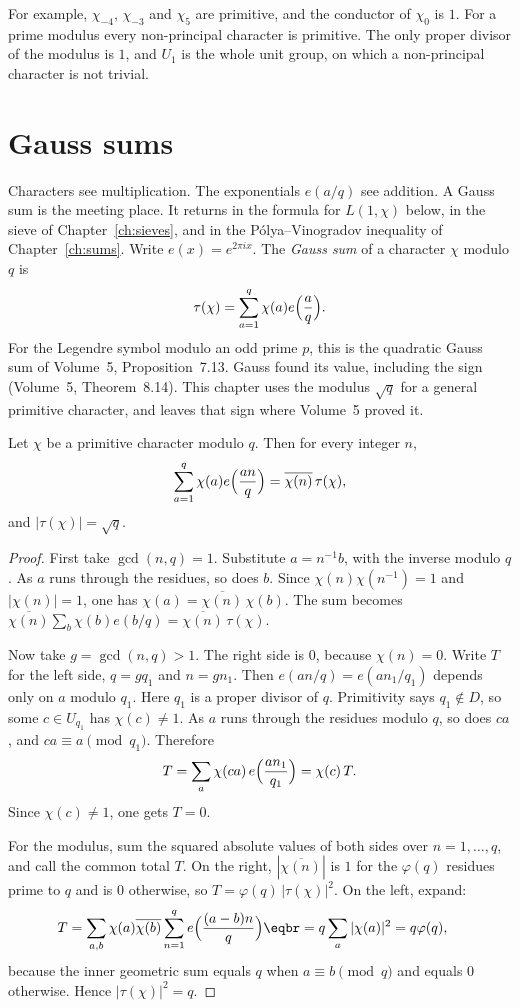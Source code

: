 For example, $\chi_{-4}$, $\chi_{-3}$ and $\chi_5$ are primitive, and the conductor of $\chi_0$ is $1$. For a prime modulus every non-principal character is primitive. The only proper divisor of the modulus is $1$, and $U_1$ is the whole unit group, on which a non-principal character is not trivial.

\section{Gauss sums}

Characters see multiplication. The exponentials $e(a/q)$ see addition. A Gauss sum is the meeting place. It returns in the formula for $L(1,\chi)$ below, in the sieve of Chapter~\ref{ch:sieves}, and in the P\'olya--Vinogradov inequality of Chapter~\ref{ch:sums}. Write $e(x)=e^{2\pi ix}$. The \emph{Gauss sum} of a character $\chi$ modulo $q$ is
\[
\tau(\chi)=\sum_{a=1}^q\chi(a)e\Bigl(\frac aq\Bigr).
\]
For the Legendre symbol modulo an odd prime $p$, this is the quadratic Gauss sum of Volume~5, Proposition~7.13. Gauss found its value, including the sign (Volume~5, Theorem~8.14). This chapter uses the modulus $\sqrt q$ for a general primitive character, and leaves that sign where Volume~5 proved it.

\begin{theorem}\label{thm:gauss}
Let $\chi$ be a primitive character modulo $q$. Then for every integer $n$,
\[
\sum_{a=1}^q\chi(a)e\Bigl(\frac{an}q\Bigr)=\overline{\chi(n)}\,\tau(\chi),
\]
and $|\tau(\chi)|=\sqrt q$.
\end{theorem}
\begin{proof}
First take $\gcd(n,q)=1$. Substitute $a=n^{-1}b$, with the inverse modulo $q$. As $a$ runs through the residues, so does $b$. Since $\chi(n)\chi(n^{-1})=1$ and $|\chi(n)|=1$, one has $\chi(a)=\overline{\chi(n)}\,\chi(b)$. The sum becomes $\overline{\chi(n)}\sum_b\chi(b)e(b/q)=\overline{\chi(n)}\,\tau(\chi)$.

Now take $g=\gcd(n,q)>1$. The right side is $0$, because $\chi(n)=0$. Write $T$ for the left side, $q=gq_1$ and $n=gn_1$. Then $e(an/q)=e(an_1/q_1)$ depends only on $a$ modulo $q_1$. Here $q_1$ is a proper divisor of $q$. Primitivity says $q_1\notin D$, so some $c\in U_{q_1}$ has $\chi(c)\ne1$. As $a$ runs through the residues modulo $q$, so does $ca$, and $ca\equiv a\pmod{q_1}$. Therefore
\[
T=\sum_a\chi(ca)\,e\Bigl(\frac{an_1}{q_1}\Bigr)=\chi(c)\,T.
\]
Since $\chi(c)\ne1$, one gets $T=0$.

For the modulus, sum the squared absolute values of both sides over $n=1,\dots,q$, and call the common total $T$. On the right, $|\overline{\chi(n)}|$ is $1$ for the $\varphi(q)$ residues prime to $q$ and is $0$ otherwise, so $T=\varphi(q)\,|\tau(\chi)|^2$. On the left, expand:
\[
\begin{aligned}T&=\sum_{a,b}\chi(a)\overline{\chi(b)}\sum_{n=1}^qe\Bigl(\frac{(a-b)n}q\Bigr)\eqbr=q\sum_a|\chi(a)|^2=q\varphi(q),\end{aligned}
\]
because the inner geometric sum equals $q$ when $a\equiv b\pmod q$ and equals $0$ otherwise. Hence $|\tau(\chi)|^2=q$.
\end{proof}

